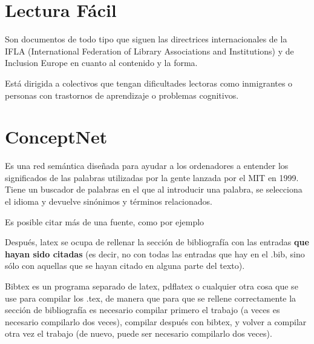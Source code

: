 \section{Lectura Fácil}

Son documentos de todo tipo que siguen las directrices internacionales de la IFLA (International Federation of Library Associations and Institutions) y de Inclusion Europe en cuanto al contenido y la forma.

Está dirigida a colectivos que tengan dificultades lectoras como inmigrantes o personas con trastornos de aprendizaje o problemas cognitivos.

\section{ConceptNet} 

Es una red semántica diseñada para ayudar a los ordenadores a entender los significados de las palabras utilizadas por la gente lanzada por el MIT en 1999.
Tiene un buscador de palabras en el que al introducir una palabra, se selecciona el idioma y devuelve sinónimos y términos relacionados.

Es posible citar más de una fuente, como por ejemplo \citep{latexCompanion,LaTeXLamport,texKnuth}

Después, latex se ocupa de rellenar la sección de bibliografía con las entradas \textbf{que hayan sido citadas} (es decir, no con todas las entradas que hay en el .bib, sino sólo con aquellas que se hayan citado en alguna parte del texto).

Bibtex es un programa separado de latex, pdflatex o cualquier otra cosa que se use para compilar los .tex, de manera que para que se rellene correctamente la sección de bibliografía es necesario compilar primero el trabajo (a veces es necesario compilarlo dos veces), compilar después con bibtex, y volver a compilar otra vez el trabajo (de nuevo, puede ser necesario compilarlo dos veces). 

